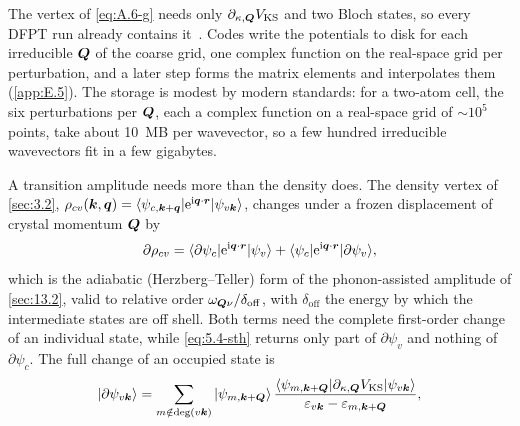 The vertex of \cref{eq:A.6-g} needs only $\partial_{\kappa,\bm{Q}}V_{\mathrm{KS}}$ and two Bloch states, so every DFPT run already contains it~\cite[Sect.~III.B.3]{giustino2017electron}. Codes write the potentials to disk for each irreducible $\bm{Q}$ of the coarse grid, one complex function on the real-space grid per perturbation, and a later step forms the matrix elements and interpolates them (\cref{app:E.5}). The storage is modest by modern standards: for a two-atom cell, the six perturbations per $\bm{Q}$, each a complex function on a real-space grid of $\sim 10^5$ points, take about \SI{10}{MB} per wavevector, so a few hundred irreducible wavevectors fit in a few gigabytes.

A transition amplitude needs more than the density does. The density vertex of \cref{sec:3.2}, $\rho_{cv}(\bm{k},\bm{q}) = \langle\psi_{c,\bm{k}+\bm{q}}|\mathrm{e}^{\mathrm{i}\bm{q}\cdot\bm{r}}|\psi_{v\bm{k}}\rangle$, changes under a frozen displacement of crystal momentum $\bm{Q}$ by
\begin{equation}
  \partial\rho_{cv} = \langle\partial\psi_{c}|\mathrm{e}^{\mathrm{i}\bm{q}\cdot\bm{r}}|\psi_{v}\rangle + \langle\psi_{c}|\mathrm{e}^{\mathrm{i}\bm{q}\cdot\bm{r}}|\partial\psi_{v}\rangle ,
  \label{eq:E.4-drho}
\end{equation}
which is the adiabatic (Herzberg--Teller) form of the phonon-assisted amplitude of \cref{sec:13.2}, valid to relative order $\omega_{\bm{Q}\nu}/\delta_{\mathrm{off}}$, with $\delta_{\mathrm{off}}$ the energy by which the intermediate states are off shell. Both terms need the complete first-order change of an individual state, while \cref{eq:5.4-sth} returns only part of $\partial\psi_{v}$ and nothing of $\partial\psi_{c}$. The full change of an occupied state is
\begin{equation}
  |\partial\psi_{v\bm{k}}\rangle = \sum_{m\notin\mathrm{deg}(v\bm{k})}|\psi_{m,\bm{k}+\bm{Q}}\rangle\,
  \frac{\langle\psi_{m,\bm{k}+\bm{Q}}|\partial_{\kappa,\bm{Q}}V_{\mathrm{KS}}|\psi_{v\bm{k}}\rangle}{\varepsilon_{v\bm{k}} - \varepsilon_{m,\bm{k}+\bm{Q}}} ,
  \label{eq:E.4-dpsi}
\end{equation}
